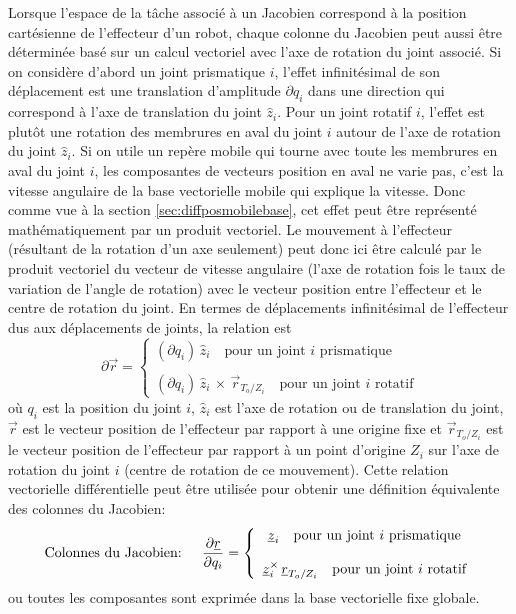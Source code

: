 Lorsque l'espace de la tâche associé à un Jacobien correspond à la position cartésienne de l'effecteur d'un robot, chaque colonne du Jacobien peut aussi être déterminée basé sur un calcul vectoriel avec l'axe de rotation du joint associé. Si on considère d'abord un joint prismatique $i$, l'effet infinitésimal de son déplacement est une translation d'amplitude $\partial q_i$ dans une direction qui correspond à l'axe de translation du joint $\hat{z}_i$. Pour un joint rotatif $i$, l'effet est plutôt une rotation des membrures en aval du joint $i$ autour de l'axe de rotation du joint $\hat{z}_i$. Si on utile un repère mobile qui tourne avec toute les membrures en aval du joint $i$, les composantes de vecteurs position en aval ne varie pas, c'est la vitesse angulaire de la base vectorielle mobile qui explique la vitesse. Donc comme vue à la section \ref{sec:diffposmobilebase}, cet effet peut être représenté mathématiquement par un produit vectoriel. Le mouvement à l'effecteur (résultant de la rotation d'un axe seulement) peut donc ici être calculé par le produit vectoriel du vecteur de vitesse angulaire (l'axe de rotation fois le taux de variation de l'angle de rotation) avec le vecteur position entre l'effecteur et le centre de rotation du joint. En termes de déplacements infinitésimal de l'effecteur dus aux déplacements de joints, la relation est
\begin{equation}
\partial \Vec{r} = \left\{ \begin{array}{c}
\left( \partial q_i \right) \, \hat{z}_i \quad \text{pour un joint $i$ prismatique}
 \\ \\
\left( \partial q_i \right) \, \hat{z}_i \, \times \, \vec{r}_{T_o/Z_i}
\quad \text{pour un joint $i$ rotatif}
\end{array}
\right.
\end{equation}
où $q_i$ est la position du joint $i$, $\hat{z}_i$ est l'axe de rotation ou de translation du joint, $\vec{r}$ est le vecteur position de l'effecteur par rapport à une origine fixe et $\vec{r}_{T_o/Z_i}$ est le vecteur position de l'effecteur par rapport à un point d'origine $Z_i$ sur l'axe de rotation du joint $i$ (centre de rotation de ce mouvement). Cette relation vectorielle différentielle peut être utilisée pour obtenir une définition équivalente des colonnes du Jacobien: 
\begin{equation}
\text{Colonnes du Jacobien: } \quad
\frac{\partial \underline{r}}{\partial q_i} = \left\{ \begin{array}{c}
\underline{z}_i \quad \text{pour un joint $i$ prismatique}
 \\ \\
\underline{z}_i^{\times} \, \underline{r}_{T_o/Z_i}
\quad \text{pour un joint $i$ rotatif}
\end{array}
\right.
\label{eq:jacocolprodvec}
\end{equation}
ou toutes les composantes sont exprimée dans la base vectorielle fixe globale.


